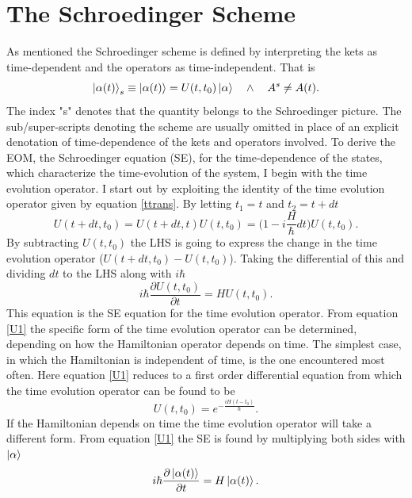 \section{The Schroedinger Scheme}
As mentioned the Schroedinger scheme is defined by interpreting the kets as time-dependent and the operators as time-independent. That is
\begin{equation}
	\ket{\alpha(t)}_s\equiv\ket{\alpha(t)}=U(t,t_0)\ket{\alpha} \quad \wedge \quad A^{s}\neq A(t).
\end{equation}   
The index "s" denotes that the quantity belongs to the Schroedinger picture. The sub/super-scripts denoting the scheme are usually omitted in place of an explicit denotation of time-dependence of the kets and operators involved.
To derive the EOM, the Schroedinger equation (SE), for the time-dependence of the states, which characterize the time-evolution of the system, I begin with the time evolution operator. I start out by exploiting the identity of the time evolution operator given by equation \eqref{ttrans}. By letting $t_1=t$ and $t_2=t+dt$
\begin{equation}
	U(t+dt,t_0)=U(t+dt,t)U(t,t_0)=\bigg(1-i\frac{H}{\hbar}dt\bigg)U(t,t_0).
\end{equation}  
By subtracting $U(t,t_0)$ the LHS is going to express the change in the time evolution operator ($U(t+dt,t_0)-U(t,t_0)$). Taking the differential of this and dividing $dt$ to the LHS along with $i\hbar$
\begin{equation}
	i\hbar\frac{\partial U(t,t_0)}{\partial t}=HU(t,t_0).
	\label{U1}
\end{equation}  
This equation is the SE equation for the time evolution operator. From equation \eqref{U1} the specific form of the time evolution operator can be determined, depending on how the Hamiltonian operator depends on time. The simplest case, in which the Hamiltonian is independent of time, is the one encountered most often. Here equation \eqref{U1} reduces to a first order differential equation from which the time evolution operator can be found to be
\begin{equation}
	U(t,t_0)=e^{-\frac{iH(t-t_0)}{\hbar}}.
	\label{TEO}
\end{equation} 
If the Hamiltonian depends on time the time evolution operator will take a different form.\newline
From equation \eqref{U1} the SE is found by multiplying both sides with $\ket{\alpha}$
\begin{equation}
	i\hbar\frac{\partial \ket{\alpha(t)}}{\partial t}=H\ket{\alpha(t)}.
	\label{SE}
\end{equation} 
